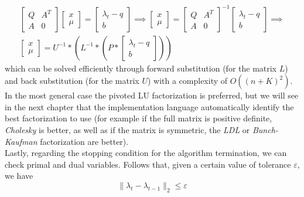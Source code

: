 \documentclass[notitlepage]{article}
\begin{document}
\begin{gather*}
  \begin{bmatrix}
    Q & A^T \\[1ex]
    A & 0 
  \end{bmatrix} 
  \begin{bmatrix}
    x \\[1ex]
    \mu
  \end{bmatrix}
  = 
  \begin{bmatrix}
    \lambda_t - q \\[1ex]
    b
  \end{bmatrix}
  \boldsymbol{\implies} 
  \begin{bmatrix}
    x \\[1ex]
    \mu
  \end{bmatrix}
  = 
  \begin{bmatrix}
    Q & A^T \\[1ex]
    A & 0 
  \end{bmatrix}^{-1}
  \begin{bmatrix}
    \lambda_t - q \\[1ex]
    b
  \end{bmatrix}
  \boldsymbol{\implies} \\
  \begin{bmatrix}
    x \\[1ex]
    \mu
  \end{bmatrix}
  = 
  U^{-1} * \left(L^{-1} * \left(P * \begin{bmatrix}
    \lambda_t - q \\[1ex]
    b
  \end{bmatrix}\right) \right)
\end{gather*}
which can be solved efficiently through forward substitution (for the matrix $L$) and back substitution (for the matrix $U$) with a complexity of $O((n+K)^2)$.\\
In the most general case the pivoted LU factorization is preferred, but we will see in the next chapter that the implementation language automatically identify the best 
factorization to use (for example if the full matrix is positive definite, \textit{Cholesky} is better, as well as if the matrix is symmetric, the \textit{LDL} or \textit{Bunch-Kaufman} factorization are better).\\ 
Lastly, regarding the stopping condition for the algorithm termination, we can check primal and dual variables. Follows that, given a certain value of tolerance $\varepsilon$, we have %
\begin{equation}
    \|\lambda_{t} - \lambda_{t-1}\|_2 \le \varepsilon
  \label{eqn:stopping-condition}
\end{equation}
\end{document}
